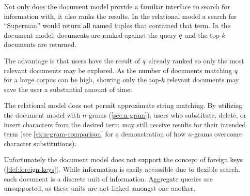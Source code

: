 		Not only does the document model provide a familiar interface to search for information with, it also ranks the results.  In the relational model a search for ``Superman'' would return all named tuples that contained that term.	 In the document model, documents are ranked against the query \(q\) and the top-\(k\) documents are returned.
		
		The advantage is that users have the result of \(q\) already ranked so only the most relevant documents may be explored.	 As the number of documents matching \(q\) for a large corpus can be high, showing only the top-\(k\) relevant documents may save the user a substantial amount of time.
		
		The relational model does not permit approximate string matching.  By utilizing the document model with \(n\)-grams (\vref{sec:n-gram}), users who substitute, delete, or insert characters from the desired term may still receive results for their intended term (see \vref{ex:n-gram-comparison} for a demonstration of how \(n\)-grams overcome character substitutions).
		
		Unfortunately the document model does not support the concept of foreign keys (\vref{def:foreign-keys}).  While information is easily accessible due to flexible search, each document is a discrete unit of information.  Aggregate queries are unsupported, as these units are not linked amongst one another.